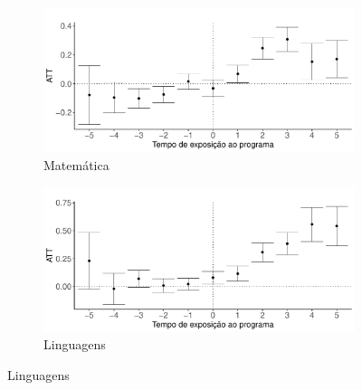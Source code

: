 \begin{figure}[H]
\caption{Efeito agregado sobre notas}
\begin{subfigure}{.5\textwidth}
  \centering
  \includegraphics[width=1\linewidth]{Charts/did_agg_matematica.pdf}  
  \caption{Matemática}
  \label{fig:efeito_matematica}
\end{subfigure}
\begin{subfigure}{.5\textwidth}
  \centering
  \includegraphics[width=1\linewidth]{Charts/did_agg_linguagem.pdf}  
  \caption{Linguagens}
  \label{fig:efeito_linguagem}
\end{subfigure}\newline


\end{figure}
